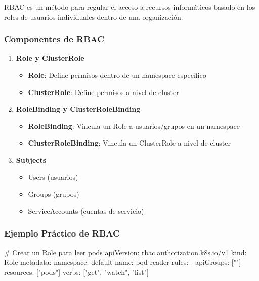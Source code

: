 \documentclass[11pt,a4paper]{article}
\begin{document}
RBAC es un método para regular el acceso a recursos informáticos basado en los roles de usuarios individuales dentro de una organización.

\subsubsection{Componentes de RBAC}

\begin{enumerate}
    \item \textbf{\textcolor{k8sblue}{Role y ClusterRole}}
    \begin{itemize}
        \item \textbf{Role}: Define permisos dentro de un namespace específico
        \item \textbf{ClusterRole}: Define permisos a nivel de cluster
    \end{itemize}
    
    \item \textbf{\textcolor{k8ssuccess}{RoleBinding y ClusterRoleBinding}}
    \begin{itemize}
        \item \textbf{RoleBinding}: Vincula un Role a usuarios/grupos en un namespace
        \item \textbf{ClusterRoleBinding}: Vincula un ClusterRole a nivel de cluster
    \end{itemize}
    
    \item \textbf{\textcolor{k8swarning}{Subjects}}
    \begin{itemize}
        \item Users (usuarios)
        \item Groups (grupos)
        \item ServiceAccounts (cuentas de servicio)
    \end{itemize}
\end{enumerate}

\subsubsection{Ejemplo Práctico de RBAC}

\begin{commandbox}
\# Crear un Role para leer pods
apiVersion: rbac.authorization.k8s.io/v1
kind: Role
metadata:
  namespace: default
  name: pod-reader
rules:
- apiGroups: [""]
  resources: ["pods"]
  verbs: ["get", "watch", "list"]
\end{commandbox}
\end{document}
